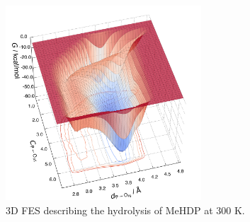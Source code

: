 \begin{figure}[htbp]
    \centering
    \includegraphics[width=0.65\textwidth]{Figures/Appendix/appendix_MeHDP_300K_fes_3d.png}
    \caption{3D FES describing the hydrolysis of MeHDP at 300 K.}
    \label{fig:fes_3d_mehdp_300k}
\end{figure}
